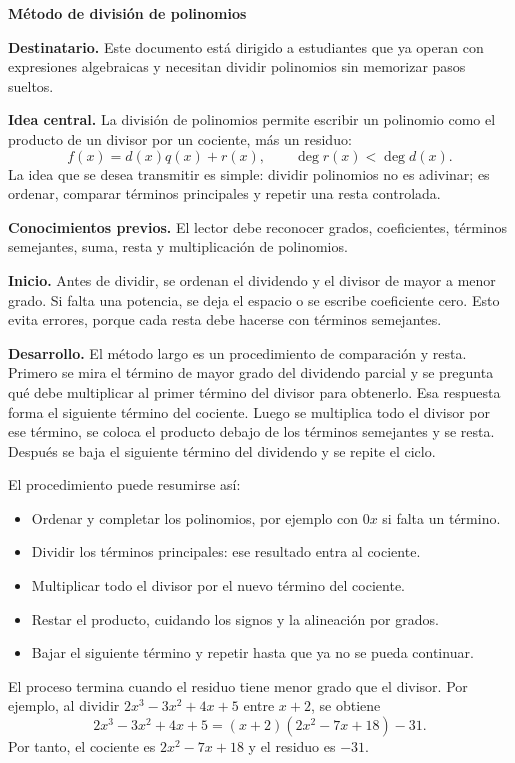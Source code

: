 \documentclass[11pt]{article}
\begin{document}
\begin{center}
{\Large \textbf{Método de división de polinomios}}
\end{center}

\textbf{Destinatario.} Este documento está dirigido a estudiantes que ya operan con expresiones algebraicas y necesitan dividir polinomios sin memorizar pasos sueltos.

\textbf{Idea central.} La división de polinomios permite escribir un polinomio como el producto de un divisor por un cociente, más un residuo:
\[
f(x)=d(x)q(x)+r(x), \qquad \deg r(x)<\deg d(x).
\]
La idea que se desea transmitir es simple: dividir polinomios no es adivinar; es ordenar, comparar términos principales y repetir una resta controlada.

\textbf{Conocimientos previos.} El lector debe reconocer grados, coeficientes, términos semejantes, suma, resta y multiplicación de polinomios.

\textbf{Inicio.} Antes de dividir, se ordenan el dividendo y el divisor de mayor a menor grado. Si falta una potencia, se deja el espacio o se escribe coeficiente cero. Esto evita errores, porque cada resta debe hacerse con términos semejantes.

\textbf{Desarrollo.} El método largo es un procedimiento de comparación y resta. Primero se mira el término de mayor grado del dividendo parcial y se pregunta qué debe multiplicar al primer término del divisor para obtenerlo. Esa respuesta forma el siguiente término del cociente. Luego se multiplica todo el divisor por ese término, se coloca el producto debajo de los términos semejantes y se resta. Después se baja el siguiente término del dividendo y se repite el ciclo.

El procedimiento puede resumirse así:
\begin{itemize}
  \item Ordenar y completar los polinomios, por ejemplo con \(0x\) si falta un término.
  \item Dividir los términos principales: ese resultado entra al cociente.
  \item Multiplicar todo el divisor por el nuevo término del cociente.
  \item Restar el producto, cuidando los signos y la alineación por grados.
  \item Bajar el siguiente término y repetir hasta que ya no se pueda continuar.
\end{itemize}
El proceso termina cuando el residuo tiene menor grado que el divisor. Por ejemplo, al dividir \(2x^3-3x^2+4x+5\) entre \(x+2\), se obtiene
\[
2x^3-3x^2+4x+5=(x+2)(2x^2-7x+18)-31.
\]
Por tanto, el cociente es \(2x^2-7x+18\) y el residuo es \(-31\).
\end{document}

